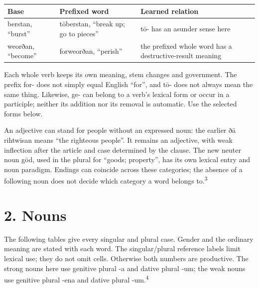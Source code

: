 \par\begingroup
\fontsize{10.5}{13.2}\selectfont
\setlength{\LTleft}{0pt}\setlength{\LTright}{\fill}
\noindent
\begin{tabular}{@{}>{\raggedright\arraybackslash}p{20.69mm}>{\raggedright\arraybackslash}p{37.43mm}>{\raggedright\arraybackslash}p{60.26mm}@{}}
\toprule
\textbf{Base} & \textbf{Prefixed word} & \textbf{Learned relation} \\
\midrule
berstan, “burst” & tōberstan, “break up; go to pieces” & tō- has an asunder sense here \\
weorðan, “become” & forweorðan, “perish” & the prefixed whole word has a destructive-result meaning \\
\bottomrule
\end{tabular}
\par\endgroup

Each whole verb keeps its own meaning, stem changes and government. The prefix for- does not simply equal English “for”, and tō- does not always mean the same thing. Likewise, ge- can belong to a verb’s lexical form or occur in a participle; neither its addition nor its removal is automatic. Use the selected forms below.

An adjective can stand for people without an expressed noun: the earlier ðā rihtwīsan means “the righteous people”. It remains an adjective, with weak inflection after the article and case determined by the clause. The new neuter noun gōd, used in the plural for “goods; property”, has its own lexical entry and noun paradigm. Endings can coincide across these categories; the absence of a following noun does not decide which category a word belongs to.\textsuperscript{3}

\section*{2. Nouns}

The following tables give every singular and plural case. Gender and the ordinary meaning are stated with each word. The singular/\allowbreak{}plural reference labels limit lexical use; they do not omit cells. Otherwise both numbers are productive. The strong nouns here use genitive plural -a and dative plural -um; the weak nouns use genitive plural -ena and dative plural -um.\textsuperscript{4}

